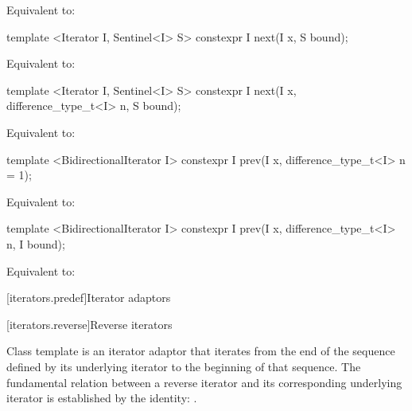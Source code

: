\begin{itemdescr}
\pnum
\effects Equivalent to: 
\end{itemdescr}

\begin{itemdecl}
template <Iterator I, Sentinel<I> S>
  constexpr I next(I x, S bound);
\end{itemdecl}

\begin{itemdescr}
\pnum
\effects Equivalent to: 
\end{itemdescr}

\begin{itemdecl}
template <Iterator I, Sentinel<I> S>
  constexpr I next(I x, difference_type_t<I> n, S bound);
\end{itemdecl}

\begin{itemdescr}
\pnum
\effects Equivalent to: 
\end{itemdescr}

%
\begin{itemdecl}
template <BidirectionalIterator I>
  constexpr I prev(I x, difference_type_t<I> n = 1);
\end{itemdecl}

\begin{itemdescr}
\pnum
\effects Equivalent to: 
\end{itemdescr}

\begin{itemdecl}
template <BidirectionalIterator I>
  constexpr I prev(I x, difference_type_t<I> n, I bound);
\end{itemdecl}

\begin{itemdescr}
\pnum
\effects Equivalent to: 
\end{itemdescr}

[iterators.predef]{Iterator adaptors}

[iterators.reverse]{Reverse iterators}

\pnum
Class template  is an iterator adaptor that iterates from the end of the sequence defined by its underlying iterator to the beginning of that sequence.
The fundamental relation between a reverse iterator and its corresponding underlying iterator
is established by the identity:
.

